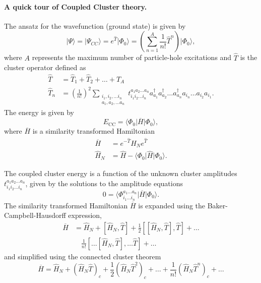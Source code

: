 \documentclass[%
twoside,                 %
final,                   %
10pt]{article}
\begin{document}
\noindent
\paragraph{A quick tour of Coupled Cluster theory.}
The ansatz for the wavefunction (ground state) is given by
\begin{equation*}
   \vert \Psi\rangle = \vert \Psi_{CC}\rangle = e^{\hat{T}} \vert \Phi_0\rangle =  
  \left( \sum_{n=1}^{A} \frac{1}{n!} \hat{T}^n \right) \vert \Phi_0\rangle,
\end{equation*}
where $A$ represents the maximum number of particle-hole excitations and $\hat{T}$ is the cluster operator defined as
\begin{align*}
            \hat{T} &= \hat{T}_1 + \hat{T}_2 + \ldots + \hat{T}_A \\
            \hat{T}_n &= \left(\frac{1}{n!}\right)^2 
                \sum_{\substack{
                        i_1,i_2,\ldots i_n \\
                        a_1,a_2,\ldots a_n}}
                t_{i_1i_2\ldots i_n}^{a_1a_2\ldots a_n} a_{a_1}^\dagger a_{a_2}^\dagger \ldots a_{a_n}^\dagger a_{i_n} \ldots a_{i_2} a_{i_1}.
        \end{align*}
    The energy is given by
    \begin{equation*}
        E_{\mathrm{CC}} = \langle\Phi_0\vert  \overline{H}\vert \Phi_0\rangle,
    \end{equation*}
    where $\overline{H}$ is a similarity transformed Hamiltonian
    \begin{align*}
        \overline{H}&= e^{-\hat{T}} \hat{H}_N e^{\hat{T}} \\
        \hat{H}_N &= \hat{H} - \langle\Phi_0\vert \hat{H} \vert \Phi_0\rangle.
    \end{align*}

    The coupled cluster energy is a function of the unknown cluster amplitudes $t_{i_1i_2\ldots i_n}^{a_1a_2\ldots a_n}$,
given by the solutions to the amplitude equations
    \begin{equation*}
        0 = \langle\Phi_{i_1 \ldots i_n}^{a_1 \ldots a_n}\vert \overline{H}\vert \Phi_0\rangle.
    \end{equation*}
The similarity transformed   Hamiltonian  $\overline{H}$ is expanded using the Baker-Campbell-Hausdorff expression,
    \begin{align*}
        \overline{H}&= \hat{H}_N + \left[ \hat{H}_N, \hat{T} \right] + 
            \frac{1}{2} \left[\left[ \hat{H}_N, \hat{T} \right], \hat{T}\right] + \ldots \\
            & \quad \frac{1}{n!} \left[ \ldots \left[ \hat{H}_N, \hat{T} \right], \ldots \hat{T} \right] +\dots
    \end{align*}
and simplified using the connected cluster theorem
    \begin{equation*}
        \overline{H}= \hat{H}_N + \left( \hat{H}_N \hat{T}\right)_c + \frac{1}{2} \left( \hat{H}_N \hat{T}^2\right)_c
            + \dots + \frac{1}{n!} \left( \hat{H}_N \hat{T}^n\right)_c +\dots
    \end{equation*}
\end{document}
